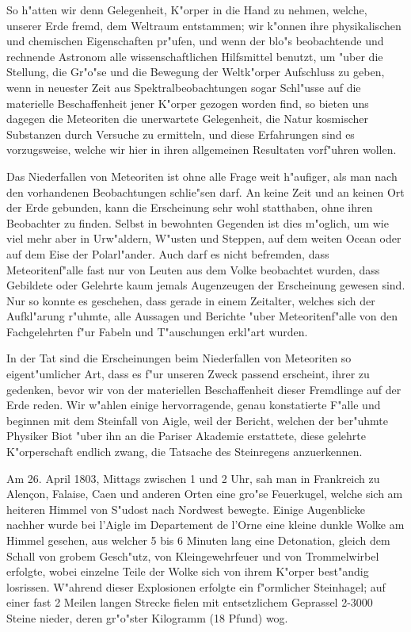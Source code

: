 \documentclass[a4paper, 11pt, oneside]{article}
\begin{document}
So h"atten wir denn Gelegenheit, K"orper in die Hand zu nehmen, welche, unserer Erde fremd, dem Weltraum entstammen; wir k"onnen ihre physikalischen und chemischen Eigenschaften pr"ufen, und wenn der blo"s beobachtende und rechnende Astronom alle wissenschaftlichen Hilfsmittel benutzt, um "uber die Stellung, die Gr"o"se und die Bewegung der Weltk"orper Aufschluss zu geben, wenn in neuester Zeit aus Spektralbeobachtungen sogar Schl"usse auf die materielle Beschaffenheit jener K"orper gezogen worden find, so bieten uns dagegen die Meteoriten die unerwartete Gelegenheit, die Natur kosmischer Substanzen durch Versuche zu ermitteln, und diese Erfahrungen sind es vorzugsweise, welche wir hier in ihren allgemeinen Resultaten vorf"uhren wollen.

Das Niederfallen von Meteoriten ist ohne alle Frage weit h"aufiger, als man nach den vorhandenen Beobachtungen schlie"sen darf. An keine Zeit und an keinen Ort der Erde gebunden, kann die Erscheinung sehr wohl statthaben, ohne ihren Beobachter zu finden. Selbst in bewohnten Gegenden ist dies m"oglich, um wie viel mehr aber in Urw"aldern, W"usten und Steppen, auf dem weiten Ocean oder auf dem Eise der Polarl"ander. Auch darf es nicht befremden, dass Meteoritenf"alle fast nur von Leuten aus dem Volke beobachtet wurden, dass Gebildete oder Gelehrte kaum jemals Augenzeugen der Erscheinung gewesen sind. Nur so konnte es geschehen, dass gerade in einem Zeitalter, welches sich der Aufkl"arung r"uhmte, alle Aussagen und Berichte "uber Meteoritenf"alle von den Fachgelehrten f"ur Fabeln und T"auschungen erkl"art wurden.

In der Tat sind die Erscheinungen beim Niederfallen von Meteoriten so eigent"umlicher Art, dass es f"ur unseren Zweck passend erscheint, ihrer zu gedenken, bevor wir von der materiellen Beschaffenheit dieser Fremdlinge auf der Erde reden. Wir w"ahlen einige hervorragende, genau konstatierte F"alle und beginnen mit dem Steinfall von Aigle, weil der Bericht, welchen der ber"uhmte Physiker Biot "uber ihn an die Pariser Akademie erstattete, diese gelehrte K"orperschaft endlich zwang, die Tatsache des Steinregens anzuerkennen.

Am 26. April 1803, Mittags zwischen 1 und 2 Uhr, sah man in Frankreich zu Alençon, Falaise, Caen und anderen Orten eine gro"se Feuerkugel, welche sich am heiteren Himmel von S"udost nach Nordwest bewegte. Einige Augenblicke nachher wurde bei l'Aigle im Departement de l'Orne eine kleine dunkle Wolke am Himmel gesehen, aus welcher 5 bis 6 Minuten lang eine Detonation, gleich dem Schall von grobem Gesch"utz, von Kleingewehrfeuer und von Trommelwirbel erfolgte, wobei einzelne Teile der Wolke sich von ihrem K"orper best"andig losrissen. W"ahrend dieser Explosionen erfolgte ein f"ormlicher Steinhagel; auf einer fast 2 Meilen langen Strecke fielen mit entsetzlichem Geprassel 2-3000 Steine nieder, deren gr"o"ster Kilogramm (18 Pfund) wog.
\end{document}
